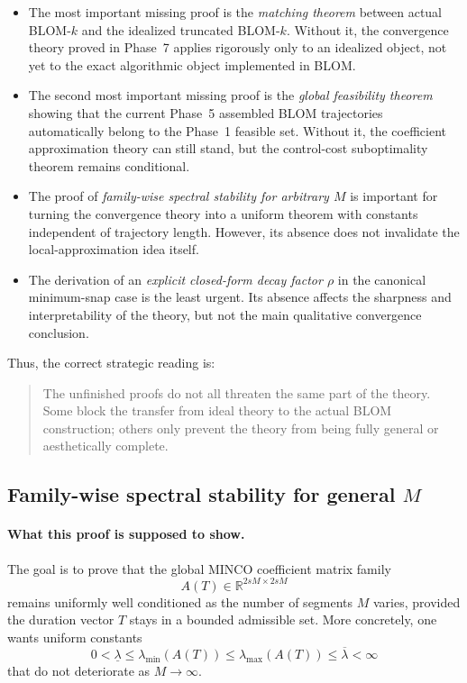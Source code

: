 \begin{itemize}
	\item The most important missing proof is the \emph{matching theorem} between actual BLOM-\(k\) and the idealized truncated BLOM-\(k\).
	Without it, the convergence theory proved in Phase~7 applies rigorously only to an idealized object, not yet to the exact algorithmic object implemented in BLOM.
	
	\item The second most important missing proof is the \emph{global feasibility theorem} showing that the current Phase~5 assembled BLOM trajectories automatically belong to the Phase~1 feasible set.
	Without it, the coefficient approximation theory can still stand, but the control-cost suboptimality theorem remains conditional.
	
	\item The proof of \emph{family-wise spectral stability for arbitrary \(M\)} is important for turning the convergence theory into a uniform theorem with constants independent of trajectory length.
	However, its absence does not invalidate the local-approximation idea itself.
	
	\item The derivation of an \emph{explicit closed-form decay factor \(\rho\)} in the canonical minimum-snap case is the least urgent.
	Its absence affects the sharpness and interpretability of the theory, but not the main qualitative convergence conclusion.
\end{itemize}

Thus, the correct strategic reading is:

\begin{quote}
	The unfinished proofs do not all threaten the same part of the theory.
	Some block the transfer from ideal theory to the actual BLOM construction; others only prevent the theory from being fully general or aesthetically complete.
\end{quote}

\subsection{Family-wise spectral stability for general \texorpdfstring{$M$}{M}}
\label{subsec:unfinished_spectral_stability}

\paragraph{What this proof is supposed to show.}
The goal is to prove that the global MINCO coefficient matrix family
\[
A(T)\in\mathbb R^{2sM\times 2sM}
\]
remains uniformly well conditioned as the number of segments \(M\) varies, provided the duration vector \(T\) stays in a bounded admissible set.
More concretely, one wants uniform constants
\[
0<\underline\lambda\le \lambda_{\min}(A(T))\le \lambda_{\max}(A(T))\le \overline\lambda<\infty
\]
that do not deteriorate as \(M\to\infty\).


